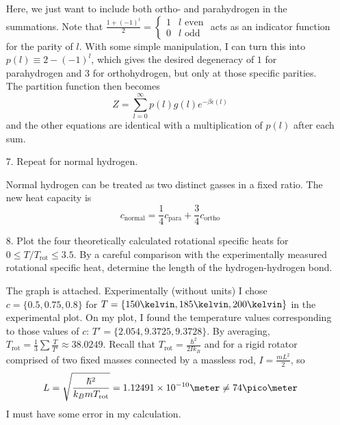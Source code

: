 \documentclass[a4paper,twoside]{article}
\begin{document}
\begin{itemize}
\begin{problem}
            Here, we just want to include both ortho- and parahydrogen in the summations. Note that $ \frac{1 + (-1)^l}{2} = \begin{cases} 1 & l \text{ even} \\ 0 & l \text{ odd} \end{cases} $ acts as an indicator function for the parity of $ l $. With some simple manipulation, I can turn this into $ p(l) \equiv 2-(-1)^l $, which gives the desired degeneracy of $ 1 $ for parahydrogen and $ 3 $ for orthohydrogen, but only at those specific parities. The partition function then becomes
            \begin{equation}
                Z = \sum_{l=0}^{\infty} p(l) g(l) e^{- \beta \epsilon(l)}
            \end{equation}
            and the other equations are identical with a multiplication of $ p(l) $ after each sum.
        \end{problem}
    \item[7.] Repeat for normal hydrogen.
        \begin{problem}
            Normal hydrogen can be treated as two distinct gasses in a fixed ratio. The new heat capacity is
            \begin{equation}
                c_{\text{normal}} = \frac{1}{4} c_{\text{para}} + \frac{3}{4} c_{\text{ortho}} 
            \end{equation}
        \end{problem}
    \item[8.] Plot the four theoretically calculated rotational specific heats for $ 0 \leq T/T_{\text{rot}} \leq 3.5 $. By a careful comparison with the experimentally measured rotational specific heat, determine the length of the hydrogen-hydrogen bond.
        \begin{problem}
            The graph is attached. Experimentally (without units) I chose $ c = \{0.5, 0.75, 0.8\} $ for $ T = \{150\kelvin, 185\kelvin, 200\kelvin\} $ in the experimental plot. On my plot, I found the temperature values corresponding to those values of $ c $: $ T' = \{2.054, 9.3725, 9.3728\} $. By averaging, $ T_{\text{rot}} = \frac{1}{3} \sum \frac{T}{T'} \approx 38.0249 $. Recall that $ T_{\text{rot}} = \frac{\hbar^2}{2I k_B} $ and for a rigid rotator comprised of two fixed masses connected by a massless rod, $ I = \frac{mL^2}{2} $, so
            \begin{equation}
                L = \sqrt{\frac{\hbar^2}{k_B m T_{\text{rot}}}} = 1.12491\times 10^{-10} \meter \neq 74\pico\meter
            \end{equation}
            I must have some error in my calculation.
        \end{problem}
\end{itemize}
\end{document}
